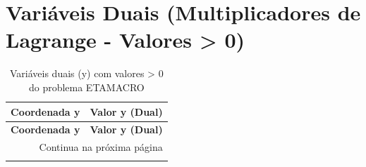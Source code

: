 \documentclass[12pt]{article}
\begin{document}
\section{Variáveis Duais (Multiplicadores de Lagrange - Valores > 0)}

\begin{longtable}{@{}cc@{}}
\caption{Variáveis duais (y) com valores > 0 do problema ETAMACRO} \\
\toprule
\textbf{Coordenada y} & \textbf{Valor y (Dual)} \\
\midrule
\endfirsthead

\toprule
\textbf{Coordenada y} & \textbf{Valor y (Dual)} \\
\midrule
\endhead

\midrule \multicolumn{2}{r}{{Continua na próxima página}} \\ \midrule
\endfoot


\end{longtable}
\end{document}
